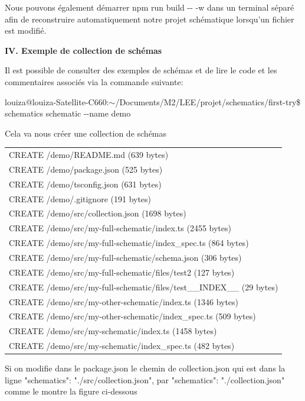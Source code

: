 \documentclass[12pt,french]{article}
\begin{document}
	Nous pouvons également démarrer npm run build \--\-- -w dans un terminal séparé afin de reconstruire automatiquement notre projet schématique lorsqu'un fichier est modifié.\newpage
	
	\textbf{IV. Exemple de collection de schémas}\newline
	
	Il est possible de consulter des exemples  de schémas et de lire le code et les commentaires associés via la commande suivante:\newline
	
	louiza@louiza-Satellite-C660:$\sim$/Documents/M2/LEE/projet/schematics/first-try\$ schematics schematic \--\--name demo\newline
	
	Cela va nous créer une collection de schémas\newline
		
	\begin{tabular}{l}
		CREATE /demo/README.md (639 bytes)\\
		CREATE /demo/package.json (525 bytes)
\\
		CREATE /demo/tsconfig.json (631 bytes)
\\
		CREATE /demo/.gitignore (191 bytes)
\\
		CREATE /demo/src/collection.json (1698 bytes)\\
		CREATE /demo/src/my-full-schematic/index.ts (2455 bytes)
\\
		CREATE /demo/src/my-full-schematic/index\_spec.ts (864 bytes)\\
		CREATE /demo/src/my-full-schematic/schema.json (306 bytes)
\\
		CREATE /demo/src/my-full-schematic/files/test2 (127 bytes)
\\
		CREATE /demo/src/my-full-schematic/files/test\_\_INDEX\_\_ (29 bytes)\\
		CREATE /demo/src/my-other-schematic/index.ts (1346 bytes)
\\
		CREATE /demo/src/my-other-schematic/index\_spec.ts (509 bytes)\\
		CREATE /demo/src/my-schematic/index.ts (1458 bytes)
\\
		CREATE /demo/src/my-schematic/index\_spec.ts (482 bytes)\\
	\end{tabular}\newline

	Si on modifie dans le package.json le chemin de collection.json qui est dans la ligne
	"schematics": "./src/collection.json", par "schematics": "./collection.json" comme le montre la figure ci-dessous
	
\end{document}
